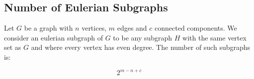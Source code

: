 \subsection{Number of Eulerian Subgraphs}

Let $G$ be a graph with $n$ vertices, $m$ edges and $c$ connected components. We consider an eulerian subgraph of $G$ to be any subgraph $H$ with the same vertex set as $G$ and where every vertex has even degree. The number of such subgraphs is:

$$
2^{m-n+c}
$$
